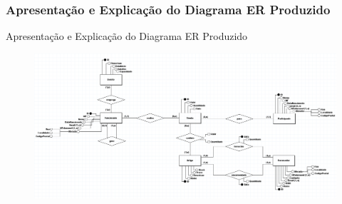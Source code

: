 \documentclass[compress,svgnames,handout,13.7pt]{beamer}
\begin{document}
\subsubsection{Apresentação e Explicação do Diagrama ER Produzido}
\begin{frame}{Apresentação e Explicação do Diagrama ER Produzido}
\begin{figure}[h]
            \centering
            \includegraphics[width=4.75in]{images/Conceitual_Com_Atributos.png}
        \end{figure}
\end{frame}
\end{document}
